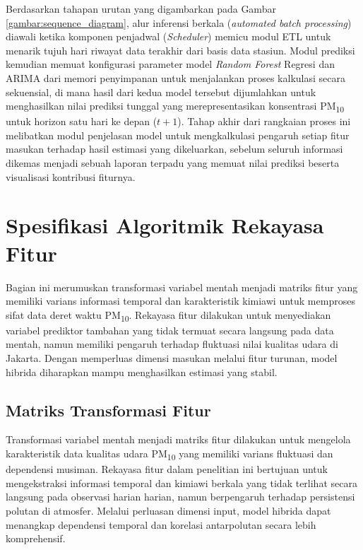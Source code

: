 \newpage

Berdasarkan tahapan urutan yang digambarkan pada Gambar \ref{gambar:sequence_diagram}, alur inferensi berkala (\textit{automated batch processing}) diawali ketika komponen penjadwal (\textit{Scheduler}) memicu modul ETL untuk menarik tujuh hari riwayat data terakhir dari basis data stasiun. Modul prediksi kemudian memuat konfigurasi parameter model \textit{Random Forest} Regresi dan ARIMA dari memori penyimpanan untuk menjalankan proses kalkulasi secara sekuensial, di mana hasil dari kedua model tersebut dijumlahkan untuk menghasilkan nilai prediksi tunggal yang merepresentasikan konsentrasi PM\textsubscript{10} untuk horizon satu hari ke depan ($t+1$). Tahap akhir dari rangkaian proses ini melibatkan modul penjelasan model untuk mengkalkulasi pengaruh setiap fitur masukan terhadap hasil estimasi yang dikeluarkan, sebelum seluruh informasi dikemas menjadi sebuah laporan terpadu yang memuat nilai prediksi beserta visualisasi kontribusi fiturnya.

\section{Spesifikasi Algoritmik Rekayasa Fitur}

Bagian ini merumuskan transformasi variabel mentah menjadi matriks fitur yang memiliki varians informasi temporal dan karakteristik kimiawi untuk memproses sifat data deret waktu PM\textsubscript{10}. Rekayasa fitur dilakukan untuk menyediakan variabel prediktor tambahan yang tidak termuat secara langsung pada data mentah, namun memiliki pengaruh terhadap fluktuasi nilai kualitas udara di Jakarta. Dengan memperluas dimensi masukan melalui fitur turunan, model hibrida diharapkan mampu menghasilkan estimasi yang stabil.

\subsection{Matriks Transformasi Fitur}

Transformasi variabel mentah menjadi matriks fitur dilakukan untuk mengelola karakteristik data kualitas udara PM\textsubscript{10} yang memiliki varians fluktuasi dan dependensi musiman. Rekayasa fitur dalam penelitian ini bertujuan untuk mengekstraksi informasi temporal dan kimiawi berkala yang tidak terlihat secara langsung pada observasi harian harian, namun berpengaruh terhadap persistensi polutan di atmosfer. Melalui perluasan dimensi input, model hibrida dapat menangkap dependensi temporal dan korelasi antarpolutan secara lebih komprehensif.

